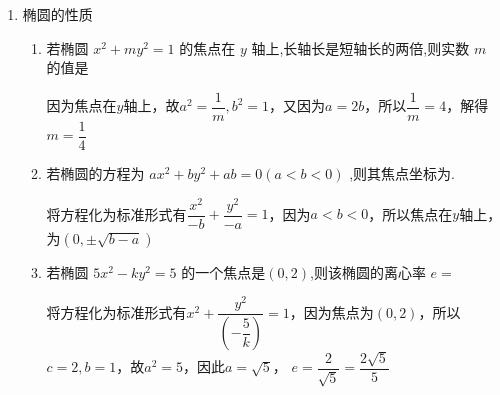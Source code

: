 \begin{enumerate}
\begin{enumerate}
\begin{jieda}
\begin{enumerate}
                \item 根据几何关系可知$b = c, a-c = \sqrt{10}-\sqrt{5}$，因此$a = \sqrt{10}, b = c = \sqrt{5}$，故椭圆的标准方程为$\dfrac{x^2}{10}+\dfrac{y^2}{5} = 1$
                \item 根据题意可知$\dfrac{a+c}{a-c} = 2$，因此$a = 3c$，故设椭圆的标准方程为$\dfrac{x^2}{9k}+\dfrac{y^2}{8k} = 1$，代入点$\left( {-3\sqrt{2},4}\right)$，解得$k = 4$，因此椭圆的标准方程为$\dfrac{x^2}{36}+\dfrac{y^2}{32} = 1$
            \end{enumerate}
        \end{jieda}
        \item 一动圆 $P$ 与圆 $A : {\left( x + 1\right) }^{2} + {y}^{2} = 1$ 外切,而与圆 $B : {\left( x - 1\right) }^{2} + {y}^{2} = {64}$ 内切,那么动圆的圆心 $P$ 的轨迹方程为
        \begin{jieda}
            易知$c = 1, 2a = 8-r+r+1 = 9$，因此$1+b^2 = \dfrac{81}{4}$，故$b^2 = \dfrac{77}{4}$，因此椭圆方程为$\dfrac{x^2}{81}+\dfrac{y^2}{77} = \dfrac{1}{4}$
        \end{jieda}
    \end{enumerate}
    \item 椭圆的性质
    \begin{enumerate}
        \item 若椭圆 ${x}^{2} + m{y}^{2} = 1$ 的焦点在 $y$ 轴上,长轴长是短轴长的两倍,则实数 $m$ 的值是
        \begin{jieda}
            因为焦点在$y$轴上，故$a^2 = \dfrac{1}{m}, b^2 = 1$，又因为$a = 2b$，所以$\dfrac{1}{m} = 4$，解得$m = \dfrac{1}{4}$
        \end{jieda}
        \item 若椭圆的方程为 $a{x}^{2} + b{y}^{2} + {ab} = 0\left( {a < b < 0}\right)$ ,则其焦点坐标为.
        \begin{jieda}
            将方程化为标准形式有$\dfrac{x^2}{-b}+\dfrac{y^2}{-a} = 1$，因为$a < b < 0$，所以焦点在$y$轴上，为$(0, \pm \sqrt{b-a})$
        \end{jieda}
        \item 若椭圆 $5{x}^{2} - k{y}^{2} = 5$ 的一个焦点是$(0,2)$,则该椭圆的离心率 $e =$ 
        \begin{jieda}
            将方程化为标准形式有$x^2 + \dfrac{y^2}{\left(-\dfrac{5}{k}\right)} = 1$，因为焦点为$(0, 2)$，所以$c = 2, b = 1$，故$a^2 = 5$，因此$a = \sqrt{5}$， $e = \dfrac{2}{\sqrt{5}} = \dfrac{2\sqrt{5}}{5}$

\end{jieda}
\end{enumerate}
\end{enumerate}

